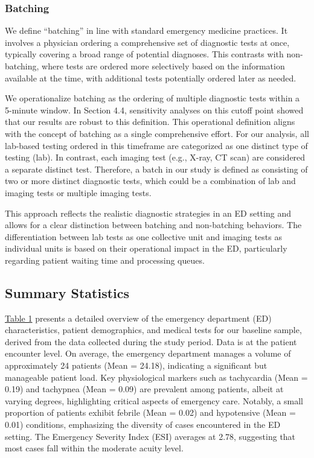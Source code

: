\documentclass[,,nonblindrev]{informs}
\begin{document}
\hypertarget{batching}{%
\subsubsection{Batching}\label{batching}}

We define ``batching'' in line with standard emergency medicine
practices. It involves a physician ordering a comprehensive set of
diagnostic tests at once, typically covering a broad range of potential
diagnoses. This contrasts with non-batching, where tests are ordered
more selectively based on the information available at the time, with
additional tests potentially ordered later as needed.

We operationalize batching as the ordering of multiple diagnostic tests
within a 5-minute window. In Section 4.4, sensitivity analyses on this
cutoff point showed that our results are robust to this definition. This
operational definition aligns with the concept of batching as a single
comprehensive effort. For our analysis, all lab-based testing ordered in
this timeframe are categorized as one distinct type of testing (lab). In
contrast, each imaging test (e.g., X-ray, CT scan) are considered a
separate distinct test. Therefore, a batch in our study is defined as
consisting of two or more distinct diagnostic tests, which could be a
combination of lab and imaging tests or multiple imaging tests.

This approach reflects the realistic diagnostic strategies in an ED
setting and allows for a clear distinction between batching and
non-batching behaviors. The differentiation between lab tests as one
collective unit and imaging tests as individual units is based on their
operational impact in the ED, particularly regarding patient waiting
time and processing queues.

\hypertarget{summary-statistics}{%
\subsection{Summary Statistics}\label{summary-statistics}}

\hyperref[tab:summary_statistics]{Table 1} presents a detailed overview
of the emergency department (ED) characteristics, patient demographics,
and medical tests for our baseline sample, derived from the data
collected during the study period. Data is at the patient encounter
level. On average, the emergency department manages a volume of
approximately 24 patients (Mean = 24.18), indicating a significant but
manageable patient load. Key physiological markers such as tachycardia
(Mean = 0.19) and tachypnea (Mean = 0.09) are prevalent among patients,
albeit at varying degrees, highlighting critical aspects of emergency
care. Notably, a small proportion of patients exhibit febrile (Mean =
0.02) and hypotensive (Mean = 0.01) conditions, emphasizing the
diversity of cases encountered in the ED setting. The Emergency Severity
Index (ESI) averages at 2.78, suggesting that most cases fall within the
moderate acuity level.
\end{document}
